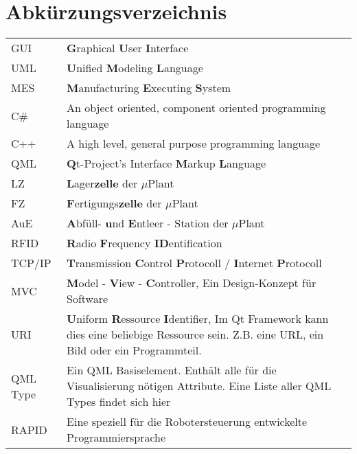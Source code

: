 \chapter*{Abkürzungsverzeichnis}

\begin{center}
	
	\renewcommand{\arraystretch}{1.1}
	
	\begin{supertabular}{p{2.1cm}p{10.9cm}}
		GUI				& \textbf{G}raphical \textbf{U}ser \textbf{I}nterface \\
		UML				& \textbf{U}nified \textbf{M}odeling \textbf{L}anguage \\
		MES				& \textbf{M}anufacturing \textbf{E}xecuting \textbf{S}ystem\\
		C\#				& An object oriented, component oriented programming language\\
		C++				& A high level, general purpose programming language\\
		QML				& \textbf{Q}t-Project's Interface \textbf{M}arkup \textbf{L}anguage\\
		LZ				& \textbf{L}ager\textbf{zelle} der $\mu$Plant\\
		FZ				& \textbf{F}ertigungs\textbf{zelle} der $\mu$Plant \\
		AuE				& \textbf{A}bfüll- \textbf{u}nd \textbf{E}ntleer - Station der $\mu$Plant \\
		RFID			& \textbf{R}adio \textbf{F}requency \textbf{ID}entification\\
		TCP/IP			& \textbf{T}ransmission \textbf{C}ontrol \textbf{P}rotocoll / \textbf{I}nternet \textbf{P}rotocoll\\
		MVC				& \textbf{M}odel - \textbf{V}iew - \textbf{C}ontroller, Ein Design-Konzept für Software\\
		URI				& \textbf{U}niform \textbf{R}essource \textbf{I}dentifier, Im Qt Framework kann dies eine beliebige
						  Ressource sein. Z.B. eine URL, ein Bild oder ein Programmteil. \\
		QML Type		& Ein QML Basiselement. Enthält alle für die Visualisierung nötigen Attribute. Eine Liste
						  aller QML Types findet sich hier \cite{qmlTypeList}\\
		RAPID			& Eine speziell für die Robotersteuerung entwickelte Programmiersprache\\
	\end{supertabular}

\end{center}